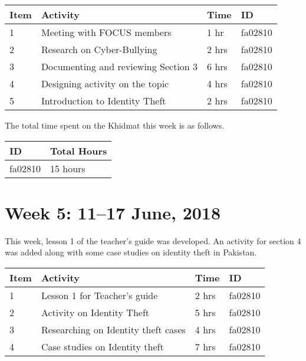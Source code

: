\documentclass{article}
\begin{document}
\begin{tabular}{|l|l|l|l|}
  \hline
  Item 	& Activity & Time & ID \\\hline\hline
  1	& Meeting with FOCUS members & 1 hr & fa02810 \\\hline
  2	& Research on Cyber-Bullying & 2 hrs & fa02810 \\\hline
  3	& Documenting and reviewing Section 3 & 6 hrs & fa02810 \\\hline
  4 & Designing activity on the topic & 4 hrs & fa02810 \\\hline
  5 & Introduction to Identity Theft & 2 hrs & fa02810 \\\hline
\end{tabular} \newline

The total time spent on the Khidmat this week is as follows. \newline

\begin{tabular}{|l|l|}
  \hline
  ID & Total Hours\\\hline\hline
  fa02810 & 15 hours\\\hline
\end{tabular}

\newpage %
\section*{Week 5: 11--17 June, 2018}

This week, lesson 1 of the teacher's guide was developed. An activity for section 4 was added along with some case studies on identity theft in Pakistan. \newline

\begin{tabular}{|l|l|l|l|}
  \hline
  Item 	& Activity & Time & ID \\\hline\hline
  1	& Lesson 1 for Teacher's guide & 2 hrs & fa02810 \\\hline
  2	& Activity on Identity Theft & 5 hrs & fa02810 \\\hline
  3	& Researching on Identity theft cases & 4 hrs & fa02810 \\\hline
  4 & Case studies on Identity theft & 7 hrs & fa02810 \\\hline
\end{tabular} \newline
\end{document}
